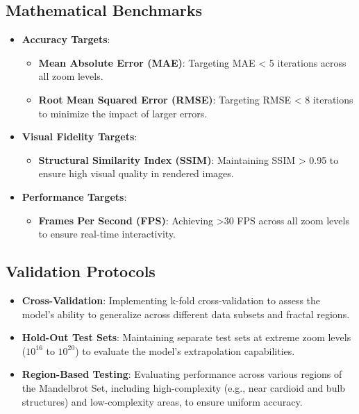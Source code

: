 \documentclass[journal]{IEEEaccess}
\begin{document}
\subsection{Mathematical Benchmarks}
\begin{itemize}
    \item \textbf{Accuracy Targets}:
    \begin{itemize}
        \item \textbf{Mean Absolute Error (MAE)}: Targeting MAE < 5 iterations across all zoom levels.
        \item \textbf{Root Mean Squared Error (RMSE)}: Targeting RMSE < 8 iterations to minimize the impact of larger errors.
    \end{itemize}
    
    \item \textbf{Visual Fidelity Targets}:
    \begin{itemize}
        \item \textbf{Structural Similarity Index (SSIM)}: Maintaining SSIM > 0.95 to ensure high visual quality in rendered images.
    \end{itemize}
    
    \item \textbf{Performance Targets}:
    \begin{itemize}
        \item \textbf{Frames Per Second (FPS)}: Achieving >30 FPS across all zoom levels to ensure real-time interactivity.
    \end{itemize}
\end{itemize}

\subsection{Validation Protocols}
\begin{itemize}
    \item \textbf{Cross-Validation}: Implementing k-fold cross-validation to assess the model's ability to generalize across different data subsets and fractal regions.
    
    \item \textbf{Hold-Out Test Sets}: Maintaining separate test sets at extreme zoom levels (\(10^{16}\) to \(10^{20}\)) to evaluate the model's extrapolation capabilities.
    
    \item \textbf{Region-Based Testing}: Evaluating performance across various regions of the Mandelbrot Set, including high-complexity (e.g., near cardioid and bulb structures) and low-complexity areas, to ensure uniform accuracy.
\end{itemize}
\end{document}
